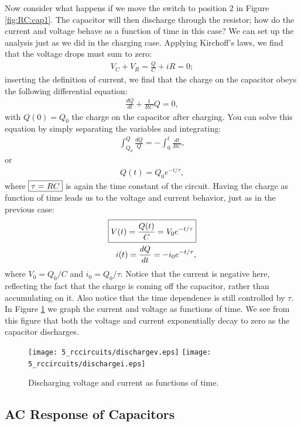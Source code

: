 Now consider what happens if we move the switch to position 2 in Figure
\ref{fig:RC:cap1}. The capacitor will then discharge through the resistor; how 
do the current and voltage behave as a function of time in this case? We can 
set up the analysis just as we did in the charging case. Applying Kirchoff's 
laws, we find that the voltage drops must sum to zero:
\begin{eqnarray*}
V_C+V_R = \frac{Q}{C} + iR = 0;
\end{eqnarray*}
inserting the definition of current, we find that the charge on the capacitor
obeys the following differential equation:
\begin{eqnarray*}
\frac{dQ}{dt} + \frac{1}{RC}Q = 0,
\end{eqnarray*}
with $Q(0)=Q_0$ the charge on the capacitor after charging. You can solve this
equation by simply separating the variables and integrating:
\begin{eqnarray*}
\int_{Q_0}^{Q} \frac{dQ}{Q} = - \int_0^t \frac{dt}{RC},
\end{eqnarray*}
or 
\begin{eqnarray*}
Q(t) = Q_0 e^{-t/\tau},
\end{eqnarray*}
where $\fbox{$ \displaystyle \tau = RC $}$  is again the time constant of the circuit. Having the charge
as function of time leads us to the voltage and current behavior, just as in 
the previous case:
\begin{eqnarray}
\fbox{$ \displaystyle V(t) = \frac{Q(t)}{C} = V_0 e^{-t/\tau} $} \label{eq:RC:discharge voltage}\\
i(t) = \frac{dQ}{dt} = - i_0 e^{-t/\tau},\nonumber
\end{eqnarray}
where $V_0 = Q_0/C$ and $i_0 = Q_0/\tau$. Notice that the current is negative
here, reflecting the fact that the charge is coming off the capacitor, rather 
than accumulating on it. Also notice that the time dependence is still 
controlled by $\tau$. In Figure \ref{fig:RC:dischargingiv} we graph the 
current and voltage as functions of time. We see from this figure that both 
the voltage and current exponentially decay to zero as the capacitor 
discharges.
\begin{figure}[htb]
\centering 
\epsfxsize=8cm \texttt{[image: 5\_rccircuits/dischargev.eps]}
            \epsfxsize=8cm \texttt{[image: 5\_rccircuits/dischargei.eps]}
\caption{Discharging voltage and current as functions of time.}
\label{fig:RC:dischargingiv}
\end{figure}

\subsection{AC Response of Capacitors}

